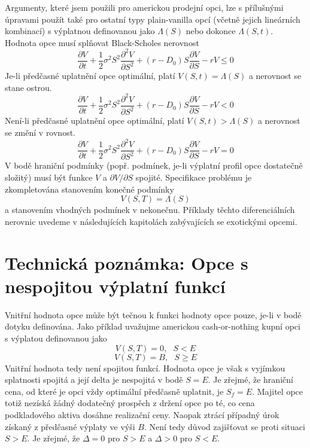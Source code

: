 \documentclass[a4paper]{book}
\begin{document}
Argumenty, které jsem použili pro americkou prodejní opci, lze s přílušnými úpravami použít také pro ostatní typy plain-vanilla opcí (včetně jejich lineárních kombinací) s výplatnou definovanou jako $\Lambda(S)$ nebo dokonce $\Lambda(S,t)$. Hodnota opce musí splňovat Black-Scholes nerovnost
\begin{equation*}
\frac{\partial V}{\partial t} + \frac{1}{2} \sigma^2 S^2 \frac{\partial^2 V}{\partial S^2} + (r - D_0) S \frac{\partial V}{\partial S} - rV \le 0
\end{equation*}
Je-li předčasné uplatnění opce optimální, platí $V(S,t) = \Lambda(S)$ a nerovnost se stane ostrou.
\begin{equation*}
\frac{\partial V}{\partial t} + \frac{1}{2} \sigma^2 S^2 \frac{\partial^2 V}{\partial S^2} + (r - D_0) S \frac{\partial V}{\partial S} - rV < 0
\end{equation*}
Není-li předčasné uplatnění opce optimální, platí $V(S,t) > \Lambda(S)$ a nerovnost se změní v rovnost.
\begin{equation*}
\frac{\partial V}{\partial t} + \frac{1}{2} \sigma^2 S^2 \frac{\partial^2 V}{\partial S^2} + (r - D_0) S \frac{\partial V}{\partial S} - rV = 0
\end{equation*}
 V bodě hraniční podmínky (popř. podmínek, je-li výplatní profil opce dostatečně složitý) musí být funkce $V$ a $\partial V / \partial S$ spojité. Specifikace problému je zkompletována stanovením konečné podmínky
\begin{equation*}
V(S,T) = \Lambda(S)
\end{equation*}
a stanovením vhodných podmínek v nekonečnu. Příklady těchto diferenciálních nerovnic uvedeme v následujících kapitolách zabývajících se exotickými opcemi.

\section{Technická poznámka: Opce s nespojitou výplatní funkcí}

Vnitřní hodnota opce může být tečnou k funkci hodnoty opce pouze, je-li v bodě dotyku definována. Jako příklad uvažujme americkou cash-or-nothing kupní opci s výplatou definovanou jako
\begin{equation*}
V(S,T) = 0,~~~S < E
\end{equation*}
\begin{equation*}
V(S,T) = B,~~~S \ge E
\end{equation*}
Vnitřní hodnota tedy není spojitou funkcí. Hodnota opce je však s vyjímkou splatnosti spojitá a její delta je nespojitá v bodě $S = E$. Je zřejmé, že hraniční cena, od které je opci vždy optimální předčasně uplatnit, je $S_f = E$. Majitel opce totiž nezíská žádný dodatečný prospěch z držení opce po té, co cena podkladového aktiva dosáhne realizační ceny. Naopak ztrácí případný úrok získaný z předčasné výplaty ve výši $B$. Není tedy důvod zajišťovat se proti situaci $S > E$. Je zřejmé, že $\Delta = 0$ pro $S > E$ a $\Delta > 0$ pro $S < E$. 
\end{document}
